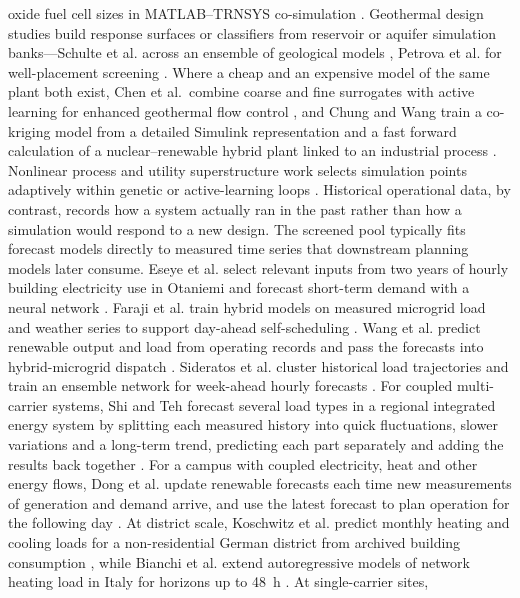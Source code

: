 oxide fuel cell sizes in MATLAB--TRNSYS co-simulation
\cite{Gao2025}. Geothermal design studies build response surfaces or
classifiers from reservoir or aquifer simulation banks---Schulte et al.
across an ensemble of geological models \cite{Schulte2020}, Petrova
et al. for well-placement screening \cite{Petrova2025}. Where a cheap
and an expensive model of the same plant both exist, Chen et al.\ combine
coarse and fine surrogates with active learning for enhanced geothermal
flow control \cite{Chen2025244}, and Chung and Wang train a co-kriging
model from a detailed Simulink representation and a fast forward
calculation of a nuclear--renewable hybrid plant linked to an industrial
process \cite{Chung2023}. Nonlinear process and utility superstructure work
selects simulation points adaptively within genetic or active-learning
loops \cite{Granacher20221573,Amoedo2023929}.
Historical operational data, by contrast, records how a system
actually ran in the past rather than how a simulation would respond to a
new design. The screened pool typically fits forecast models directly to
measured time series that downstream planning models later consume.
Eseye et al. select relevant inputs from two years of hourly building
electricity use in Otaniemi and forecast short-term demand with a neural
network \cite{Eseye201991463}. Faraji et al. train hybrid models on
measured microgrid load and weather series to support day-ahead
self-scheduling \cite{Faraji2020157284}. Wang et al. predict renewable
output and load from operating records and pass the forecasts into
hybrid-microgrid dispatch \cite{Wang20192635}. Sideratos et al. cluster
historical load trajectories and train an ensemble network for week-ahead
hourly forecasts \cite{Sideratos2020}. For coupled multi-carrier
systems, Shi and Teh forecast several load types in a regional
integrated energy system by splitting each measured history into quick
fluctuations, slower variations and a long-term trend, predicting each
part separately and adding the results back together
\cite{Shi2024__2}. For a campus with coupled electricity, heat and other
energy flows, Dong et al. update renewable forecasts each time new
measurements of generation and demand arrive, and use the latest
forecast to plan operation for the following day \cite{Dong2024}. At
district scale, Koschwitz et al. predict monthly
heating and cooling loads for a non-residential German district from
archived building consumption \cite{Koschwitz2018134}, while Bianchi
et al. extend autoregressive models of network heating load in Italy for
horizons up to 48~h \cite{Bianchi2020244}. At single-carrier sites,
